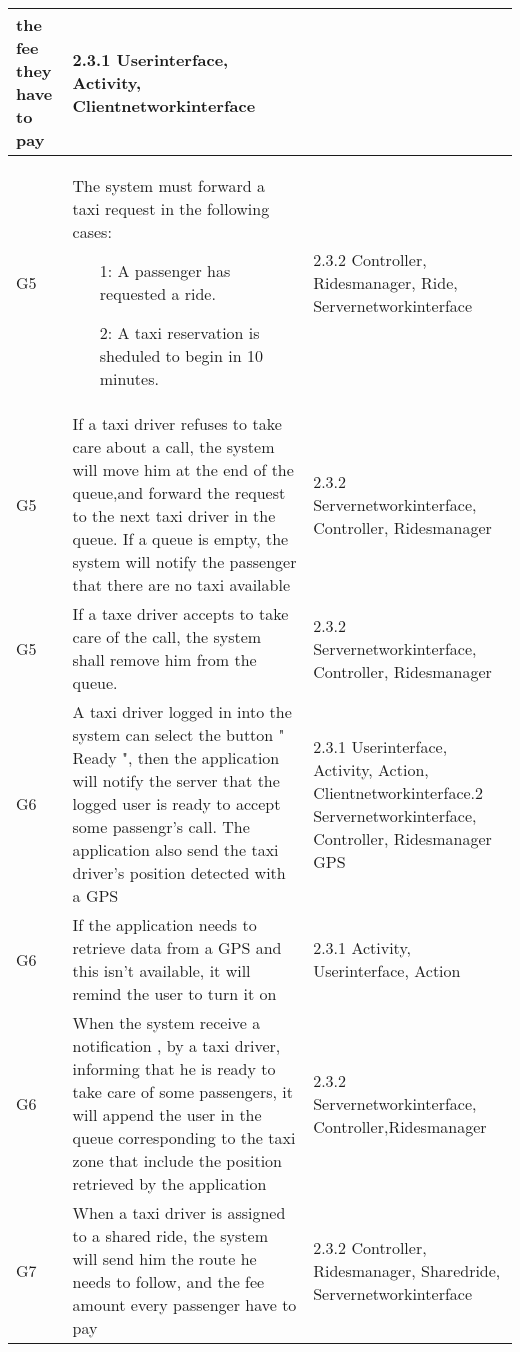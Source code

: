 \begin{center}
\begin{longtable}{| m{2cm} | m{6cm} | m{5cm} | }
	the fee they have to pay & 2.3.1 Userinterface, Activity, Clientnetworkinterface\\ \hline
    G5& The system must forward a taxi request in the following cases:
	  \begin{itemize}
	   \item [1:] A passenger has requested a ride.
	   \item [2:] A taxi reservation is sheduled to begin in 10 minutes.
	  \end{itemize} & 2.3.2 Controller, Ridesmanager, Ride, Servernetworkinterface\\ \hline
    G5& If a taxi driver refuses to take care about a call, the system will move him at the end of the queue,and forward the
	request to the next taxi driver in the queue. If a queue is empty, the system will notify the passenger that there are no taxi available& 2.3.2	Servernetworkinterface, Controller, Ridesmanager\\ \hline
    G5&If a taxe driver accepts to take care of the call, the system shall  remove him from the queue. & 2.3.2 Servernetworkinterface, Controller, Ridesmanager\\ \hline
    G6&A taxi driver logged in into the system can select the button " Ready ", then the application will notify the server that 
	the logged user is ready to accept some passengr's call. The application also send the taxi driver's position detected with a GPS& 2.3.1 Userinterface, Activity, Action, Clientnetworkinterface\newline
																	    2.3.2 Servernetworkinterface, Controller, Ridesmanager\newline
																	     2.1 GPS\\ \hline
    G6&If the application needs to retrieve data from a GPS and this isn't available, it will remind  the user to turn it on&  2.3.1 Activity, Userinterface, Action\\ \hline
    G6&When the system receive a notification , by a taxi driver, informing that he is ready to take care of some passengers, 
	it will append the user in the queue corresponding to the taxi zone that include the position retrieved by the application&  2.3.2 Servernetworkinterface, Controller,Ridesmanager\\ \hline
    G7&When a taxi driver is assigned to a shared ride, the system will send him the route he needs to follow, and the fee 
	amount every passenger have to pay& 2.3.2 Controller, Ridesmanager, Sharedride, Servernetworkinterface\\ \hline

\end{longtable}
\end{center}

